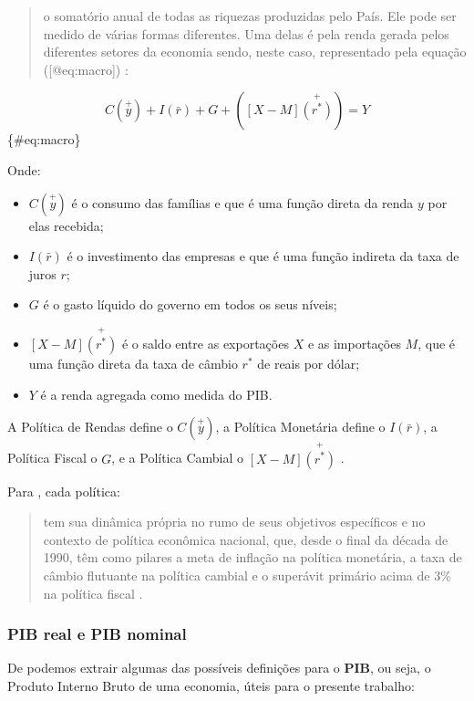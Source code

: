 \documentclass[]{article}
\providecommand{\tightlist}{%
  \setlength{\itemsep}{0pt}\setlength{\parskip}{0pt}}
\begin{document}
\begin{quote}
o somatório anual de todas as riquezas produzidas pelo País. Ele pode
ser medido de várias formas diferentes. Uma delas é pela renda gerada
pelos diferentes setores da economia sendo, neste caso, representado
pela equação ({[}@eq:macro{]}) \cite[p.~53]{fortuna2015}:
\end{quote}

\[C(\stackrel{+}{y}) + I(\bar{r}) + G + ([X - M]\stackrel{+}{(r^*)}) =
Y\] \{\#eq:macro\}

Onde:

\begin{itemize}
\tightlist
\item
  \(C(\stackrel{+}{y})\) é o consumo das famílias e que é uma função
  direta da renda \(y\) por elas recebida;
\item
  \(I(\bar{r})\) é o investimento das empresas e que é uma função
  indireta da taxa de juros \(r\);
\item
  \(G\) é o gasto líquido do governo em todos os seus níveis;
\item
  \([X - M]\stackrel{+}{(r^*)}\) é o saldo entre as exportações \(X\) e
  as importações \(M\), que é uma função direta da taxa de câmbio
  \(r^*\) de reais por dólar;
\item
  \(Y\) é a renda agregada como medida do PIB.
\end{itemize}

A Política de Rendas define o \(C(\stackrel{+}{y})\), a Política
Monetária define o \(I(\bar{r})\), a Política Fiscal o \(G\), e a
Política Cambial o \([X - M]\stackrel{+}{(r^*)}\)
\cite[p.~53]{fortuna2015}.

Para , cada política:

\begin{quote}
tem sua dinâmica própria no rumo de seus objetivos específicos e no
contexto de política econômica nacional, que, desde o final da década de
1990, têm como pilares a meta de inflação na política monetária, a taxa
de câmbio flutuante na política cambial e o superávit primário acima de
3\% na política fiscal \cite[p.~53]{fortuna2015}.
\end{quote}

\subsubsection{PIB real e PIB nominal}\label{subsec:pib}

De  podemos extrair algumas das possíveis
definições para o \textbf{PIB}, ou seja, o Produto Interno Bruto de uma
economia, úteis para o presente trabalho:
\end{document}
